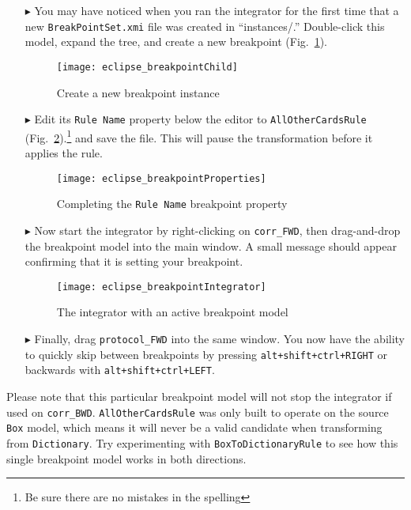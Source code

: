 \begin{itemize}

\item[$\blacktriangleright$] You may have noticed when you ran the integrator for the first time that a new \texttt{BreakPointSet.xmi} file was created in
``instances/.'' Double-click this model, expand the tree, and create a new breakpoint (Fig.~\ref{eclipse:breakpointChild}).

\begin{figure}[htbp]
\begin{center}
  \texttt{[image: eclipse\_breakpointChild]}
  \caption{Create a new breakpoint instance}
  \label{eclipse:breakpointChild}
\end{center}
\end{figure}

\item[$\blacktriangleright$] Edit its \texttt{Rule Name} property below the editor to \texttt{AllOtherCardsRule} (Fig.~\ref{eclipse:bpProps}).\footnote{Be sure
there are no mistakes in the spelling} and save the file. This will pause the transformation before it applies the rule.

\begin{figure}[htbp]
\begin{center}
  \texttt{[image: eclipse\_breakpointProperties]}
  \caption{Completing the \texttt{Rule Name} breakpoint property}
  \label{eclipse:bpProps}
\end{center}
\end{figure}

\item[$\blacktriangleright$] Now start the integrator by right-clicking on \texttt{corr\_FWD}, then drag-and-drop the breakpoint model into
the main window. A small message should appear confirming that it is setting your breakpoint. 

\begin{figure}[htbp]
\begin{center}
  \texttt{[image: eclipse\_breakpointIntegrator]}
  \caption{The integrator with an active breakpoint model}
  \label{eclipse:bpIntegrator}
\end{center}
\end{figure}

\item[$\blacktriangleright$] Finally, drag \texttt{protocol\_FWD} into the same window. You now have the ability to quickly skip between breakpoints
by pressing \texttt{alt\-+shift\-+ctrl\-+RIGHT} or backwards with \texttt{alt\-+shift\-+ctrl\-+LEFT}.

\end{itemize}

Please note that this particular breakpoint model will not stop the integrator if used on \texttt{corr\_BWD}. \texttt{AllOtherCardsRule} was only built to
operate on the source \texttt{Box} model, which means it will never be a valid candidate when transforming from \texttt{Dictionary}. Try experimenting with
\texttt{BoxToDictionaryRule} to see how this single breakpoint model works in both directions.

